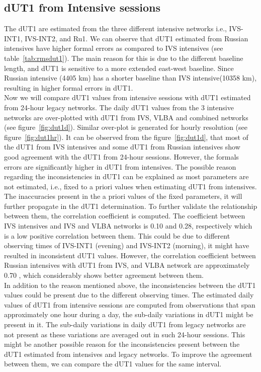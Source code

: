 \documentclass[smallextended]{svjour3}       %
\begin{document}
\subsection{dUT1 from Intensive sessions}
The dUT1 are estimated from the three different intensive networks i.e., IVS-INT1, IVS-INT2, and Ru1. We can observe that dUT1 estimated from Russian intensives have higher formal errors as compared to IVS intensives (see table~\ref{tab:rmsdut1}). The main reason for this is due to the different baseline length, and dUT1 is sensitive to a more extended east-west baseline. Since Russian intensive (4405 km) has a shorter baseline than IVS intensive(10358 km), resulting in higher formal errors in dUT1. \\
Now we will compare dUT1 values from intensive sessions with dUT1 estimated from 24-hour legacy networks. The daily dUT1 values from the 3 intensive networks are over-plotted with dUT1 from IVS, VLBA and combined networks (see figure~\ref{fig:dut1d}). Similar over-plot is generated for hourly resolution (see figure~\ref{fig:dut1hr}).
It can be observed from the figure~\ref{fig:dut1d}, that most of the dUT1 from IVS intensives and some dUT1 from Russian intensives show good agreement with the dUT1 from 24-hour sessions. However, the formals errors are significantly higher in dUT1 from intensives. The possible reason regarding the inconsistencies in dUT1 can be explained as most parameters are not estimated, i.e., fixed to a priori values when estimating dUT1 from intensives. The inaccuracies present in the a priori values of the fixed parameters, it will further propagate in the dUT1 determination. To further validate the relationship between them, the correlation coefficient is computed. The coefficient between IVS intensives and IVS and VLBA networks is 0.10 and 0.28, respectively which is a low positive correlation between them. This could be due to different observing times of IVS-INT1 (evening) and IVS-INT2 (morning), it might have resulted in inconsistent dUT1 values. However, the correlation coefficient between Russian intensives with dUT1 from IVS, and VLBA network are approximately 0.70 , which considerably shows better agreement between them.  \\
In addition to the reason mentioned above, the inconsistencies between the dUT1 values could be present due to the different observing times. The estimated daily values of dUT1 from intensive sessions are computed from observations that span approximately one hour during a day, the sub-daily variations in dUT1 might be present in it. The sub-daily variations in daily dUT1 from legacy networks are not present as these variations are averaged out in such 24-hour sessions. This might be another possible reason for the inconsistencies present between the dUT1 estimated from intensives and legacy networks. To improve the agreement between them, we can compare the dUT1 values for the same interval. \\
\end{document}

